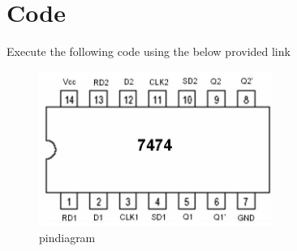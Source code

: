 \documentclass{article}
\begin{document}
\section{Code}
Execute the following code using the below provided link
\\
\begin{table}[ht]


\end{table}
\begin{figure}
\centering
\includegraphics[width=3in]{pindiagram.png}
\caption{pindiagram}
\label{fig:7474}
\end{figure}
\end{document}
